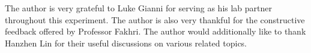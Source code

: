 \documentclass[aps,twocolumn,secnumarabic,balancelastpage,amsmath,amssymb,nofootinbib, floatfix]{revtex4-2}
\begin{document}
	
	\begin{acknowledgments} The author is very grateful to Luke Gianni for serving as his lab partner throughout this experiment. The author is also very thankful for the constructive feedback offered by Professor Fakhri. The author would additionally like to thank Hanzhen Lin for their useful discussions on various related topics. 
	\end{acknowledgments}
	
	
	
	
\end{document}
